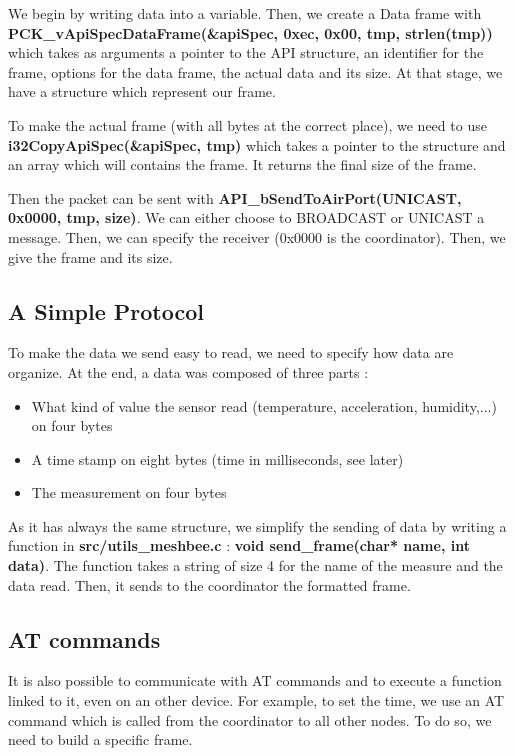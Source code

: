 We begin by writing data into a variable. Then, we create a Data frame with \textbf{PCK\_vApiSpecDataFrame(\&apiSpec, 0xec, 0x00, tmp, strlen(tmp))} which takes as arguments a pointer to the API structure, an identifier for the frame, options for the data frame, the actual data and its size. At that stage, we have a structure which represent our frame.

To make the actual frame (with all bytes at the correct place), we need to use \textbf{i32CopyApiSpec(\&apiSpec, tmp)} which takes a pointer to the structure and an array which will contains the frame. It returns the final size of the frame.

Then the packet can be sent with \textbf{API\_bSendToAirPort(UNICAST, 0x0000, tmp, size)}. We can either choose to BROADCAST or UNICAST a message. Then, we can specify the receiver (0x0000 is the coordinator). Then, we give the frame and its size.

\subsection{A Simple Protocol}

To make the data we send easy to read, we need to specify how data are organize. At the end, a data was composed of three parts :

\begin{itemize}
\item What kind of value the sensor read (temperature, acceleration, humidity,...) on four bytes
\item A time stamp on eight bytes (time in milliseconds, see later)
\item The measurement on four bytes
\end{itemize}

As it has always the same structure, we simplify the sending of data by writing a function in \textbf{src/utils\_meshbee.c} :\textbf{ void send\_frame(char* name, int data)}. The function takes a string of size 4 for the name of the measure and the data read. Then, it sends to the coordinator the formatted frame.

\subsection{AT commands}

It is also possible to communicate with AT commands and to execute a function linked to it, even on an other device. For example, to set the time, we use an AT command which is called from the coordinator to all other nodes. To do so, we need to build a specific frame.

